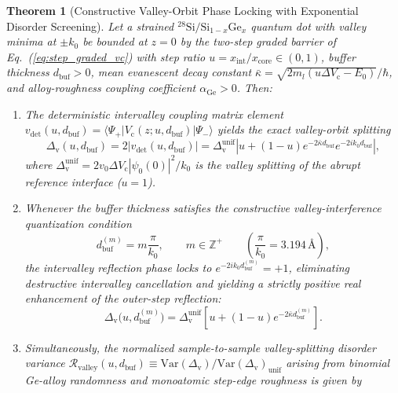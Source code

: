 \documentclass[11pt,letterpaper]{article}
\newtheorem{theorem}{Theorem}
\theoremstyle{definition}
\begin{document}
\begin{theorem}[Constructive Valley-Orbit Phase Locking with Exponential Disorder Screening]
\label{thm:valley_phase_locking}
Let a strained ${}^{28}\mathrm{Si}/\mathrm{Si}_{1-x}\mathrm{Ge}_x$ quantum dot with valley minima at $\pm k_0$ be bounded at $z=0$ by the two-step graded barrier of Eq.~(\ref{eq:step_graded_vc}) with step ratio $u = x_{\mathrm{int}}/x_{\mathrm{core}} \in (0,1)$, buffer thickness $d_{\mathrm{buf}} > 0$, mean evanescent decay constant $\bar{\kappa} = \sqrt{2m_l(u\Delta V_{\mathrm{c}} - E_0)}/\hbar$, and alloy-roughness coupling coefficient $\alpha_{\mathrm{Ge}} > 0$. Then:
\begin{enumerate}
  \item[(i)] The deterministic intervalley coupling matrix element $v_{\mathrm{det}}(u, d_{\mathrm{buf}}) = \langle \Psi_+ | V_{\mathrm{c}}(z; u, d_{\mathrm{buf}}) | \Psi_- \rangle$ yields the exact valley-orbit splitting
  \begin{equation}
    \Delta_{\mathrm{v}}(u, d_{\mathrm{buf}}) = 2|v_{\mathrm{det}}(u, d_{\mathrm{buf}})| = \Delta_{\mathrm{v}}^{\mathrm{unif}} \left| u + (1 - u) e^{-2\bar{\kappa} d_{\mathrm{buf}}} e^{-2i k_0 d_{\mathrm{buf}}} \right|,
    \label{eq:thm1_valley_splitting}
  \end{equation}
  where $\Delta_{\mathrm{v}}^{\mathrm{unif}} = 2 v_0 \Delta V_{\mathrm{c}} |\psi_0(0)|^2 / k_0$ is the valley splitting of the abrupt reference interface ($u=1$).
  \item[(ii)] Whenever the buffer thickness satisfies the constructive valley-interference quantization condition
  \begin{equation}
    d_{\mathrm{buf}}^{(m)} = m \frac{\pi}{k_0}, \qquad m \in \mathbb{Z}^+ \qquad \left(\frac{\pi}{k_0} = 3.194\,\text{\AA}\right),
    \label{eq:thm1_constructive_nodes}
  \end{equation}
  the intervalley reflection phase locks to $e^{-2i k_0 d_{\mathrm{buf}}^{(m)}} = +1$, eliminating destructive intervalley cancellation and yielding a strictly positive real enhancement of the outer-step reflection:
  \begin{equation}
    \Delta_{\mathrm{v}}\bigl(u, d_{\mathrm{buf}}^{(m)}\bigr) = \Delta_{\mathrm{v}}^{\mathrm{unif}} \left[ u + (1 - u) e^{-2\bar{\kappa} d_{\mathrm{buf}}^{(m)}} \right].
    \label{eq:thm1_locked_splitting}
  \end{equation}
  \item[(iii)] Simultaneously, the normalized sample-to-sample valley-splitting disorder variance $\mathcal{R}_{\mathrm{valley}}(u, d_{\mathrm{buf}}) \equiv \mathrm{Var}(\Delta_{\mathrm{v}}) / \mathrm{Var}(\Delta_{\mathrm{v}})_{\mathrm{unif}}$ arising from binomial Ge-alloy randomness and monoatomic step-edge roughness is given by

\end{enumerate}
\end{theorem}
\end{document}
